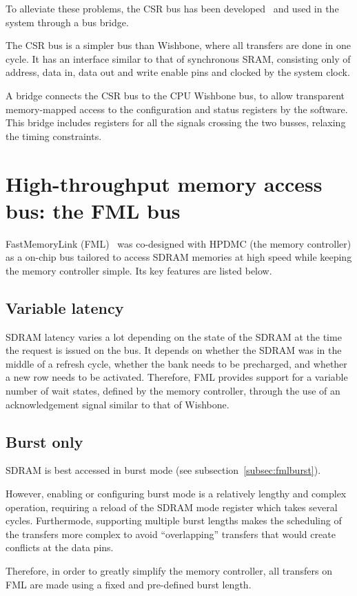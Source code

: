 \documentclass[a4paper,11pt]{kthesis}
\begin{document}
To alleviate these problems, the CSR bus has been developed~\cite{csr} and used in the system through a bus bridge.

The CSR bus is a simpler bus than Wishbone, where all transfers are done in one cycle. It has an interface similar to that of synchronous SRAM, consisting only of address, data in, data out and write enable pins and clocked by the system clock.

A bridge connects the CSR bus to the CPU Wishbone bus, to allow transparent memory-mapped access to the configuration and status registers by the software. This bridge includes registers for all the signals crossing the two busses, relaxing the timing constraints.

\section{High-throughput memory access bus: the FML bus}
FastMemoryLink (FML)~\cite{fml} was co-designed with HPDMC (the memory controller) as a on-chip bus tailored to access SDRAM memories at high speed while keeping the memory controller simple. Its key features are listed below.

\subsection{Variable latency}
SDRAM latency varies a lot depending on the state of the SDRAM at the time the request is issued on the bus. It depends on whether the SDRAM was in the middle of a refresh cycle, whether the bank needs to be precharged, and whether a new row needs to be activated. Therefore, FML provides support for a variable number of wait states, defined by the memory controller, through the use of an acknowledgement signal similar to that of Wishbone.

\subsection{Burst only}
SDRAM is best accessed in burst mode (see subsection~\ref{subsec:fmlburst}).

However, enabling or configuring burst mode is a relatively lengthy and complex operation, requiring a reload of the SDRAM mode register which takes several cycles. Furthermode, supporting multiple burst lengths makes the scheduling of the transfers more complex to avoid ``overlapping'' transfers that would create conflicts at the data pins.

Therefore, in order to greatly simplify the memory controller, all transfers on FML are made using a fixed and pre-defined burst length.
\end{document}
